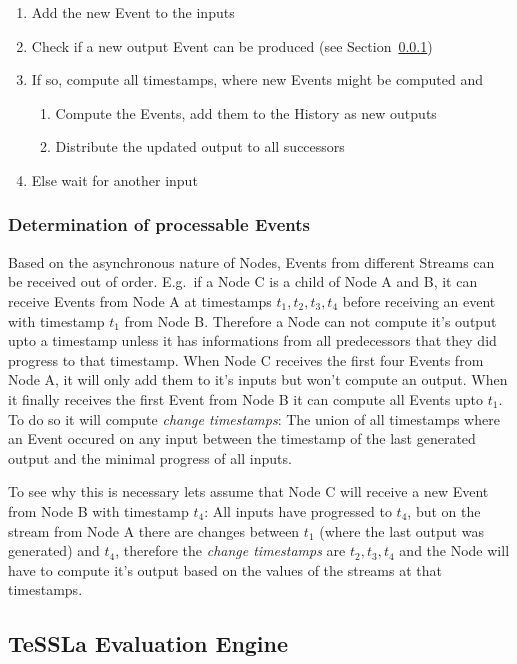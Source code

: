 \begin{enumerate}
  \item Add the new Event to the inputs
  \item Check if a new output Event can be produced (see Section~\ref{sec:concepts:defs:nodes:processable})
  \item If so, compute all timestamps, where new Events might be computed and
    \begin{enumerate}
      \item Compute the Events, add them to the History as new outputs
      \item Distribute the updated output to all successors
    \end{enumerate}
  \item Else wait for another input
\end{enumerate}

\subsubsection{Determination of processable Events}
\label{sec:concepts:defs:nodes:processable}

Based on the asynchronous nature of Nodes, Events from different Streams can be received out of order.
E.g.\ if a Node C is a child of Node A and B, it can receive Events from Node A at timestamps \(t_1, t_2, t_3, t_4\)
before receiving an event with timestamp \(t_1\) from Node B.
Therefore a Node can not compute it's output upto a timestamp unless it has informations from all predecessors that they did progress to that timestamp.
When Node C receives the first four Events from Node A, it will only add them to it's inputs but won't compute an output.
When it finally receives the first Event from Node B it can compute all Events upto \(t_1\).
To do so it will compute \emph{change timestamps}: The union of all timestamps where an Event occured on any input between the timestamp of the last generated output and the minimal progress of all inputs.

To see why this is necessary lets assume that Node C will receive a new Event from Node B with timestamp \(t_4\):
All inputs have progressed to \(t_4\), but on the stream from Node A there are changes between \(t_1\) (where the last output was generated) and \(t_4\),
therefore the \emph{change timestamps} are \(t_2, t_3, t_4\) and the Node will have to compute it's output based on the values of the streams at that timestamps.

\subsection{TeSSLa Evaluation Engine}
\label{sec:concepts:def:model}

